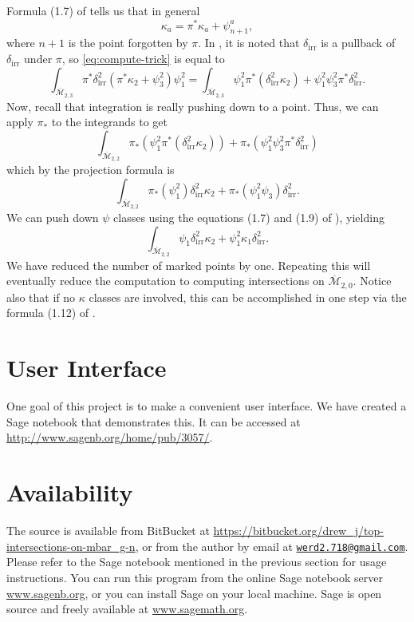 \documentclass{amsart}
\newcommand{\M}[2]{\overline{\mathcal M}_{{#1},{#2}}}
\newcommand{\di}{\delta_{\text{irr}}}
\begin{document}
Formula (1.7) of \cite{AC} tells us that in general
\[
	\kappa_a = \pi^* \kappa_a + \psi_{n+1}^a,
\]
where $n+1$ is the point forgotten by $\pi$.  In \cite{faber}, it is noted that $\di$ is a pullback of $\di$ under $\pi$, so  \eqref{eq:compute-trick} is equal to
\[
 \int_{\M23} \pi^* \di^2 (\pi^* \kappa_2 + \psi_3^2) \psi_1^2 = \int_{\M23} \psi_1^2 \pi^*(\di^2 \kappa_2) + \psi_1^2\psi_3^2 \pi^*\di^2.
\]
Now, recall that integration is really pushing down to a point.  Thus, we can apply $\pi_*$ to the integrands to get
\[
 \int_{\M22} \pi_*(\psi_1^2 \pi^*(\di^2 \kappa_2)) + \pi_*(\psi_1^2\psi_3^2 \pi^*\di^2)
\]
which by the projection formula is 
\[
	\int_{\M22} \pi_*(\psi_1^2) \di^2 \kappa_2 + \pi_*(\psi_1^2\psi_3)\di^2. 
\]
We can push down $\psi$ classes using the equations (1.7) and (1.9) of \cite{AC}), yielding
\[
  \int_{\M22} \psi_1 \di^2 \kappa_2 + \psi_1^2 \kappa_1 \di^2.
\]
  We have reduced the number of marked points by one.  Repeating this will eventually reduce the computation to computing intersections on $\M20$.  Notice also that if no $\kappa$ classes are involved, this can be accomplished in one step via the formula (1.12) of \cite{AC}.
  
\section{User Interface}
One goal of this project is to make a convenient user interface.  We have created a Sage notebook that demonstrates this.  It can be accessed at \url{http://www.sagenb.org/home/pub/3057/}.
\section{Availability}
The source is available from BitBucket at \url{https://bitbucket.org/drew_j/top-intersections-on-mbar_g-n}, or from the author by email at \href{mailto:werd2.718@gmail.com}{\nolinkurl{werd2.718@gmail.com}}.  Please refer to the Sage notebook mentioned in the previous section for usage instructions.  You can run this program from the online Sage notebook server \url{www.sagenb.org}, or you can install Sage on your local machine.  Sage is open source and freely available at \url{www.sagemath.org}.



\end{document}
